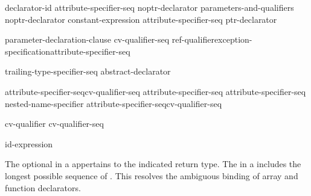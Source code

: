 \begin{bnf}
\br
    declarator-id attribute-specifier-seq\opt\br
    noptr-declarator parameters-and-qualifiers\br
    noptr-declarator \terminal{[} constant-expression\opt \terminal{]} attribute-specifier-seq\opt\br
    \terminal{(} ptr-declarator \terminal{)}
\end{bnf}

\begin{bnf}
\br
    \terminal{(} parameter-declaration-clause \terminal{)} cv-qualifier-seq\opt\br
\hspace*{\bnfindentinc}ref-qualifier\opt exception-specification\opt attribute-specifier-seq\opt
\end{bnf}

\begin{bnf}
\br
    \terminal{->} trailing-type-specifier-seq abstract-declarator\opt
\end{bnf}

\begin{bnf}
\br
    \terminal{*} attribute-specifier-seq\opt cv-qualifier-seq\opt\br
    \terminal{\&} attribute-specifier-seq\opt\br
    \terminal{\&\&} attribute-specifier-seq\opt\br
    nested-name-specifier \terminal{*} attribute-specifier-seq\opt cv-qualifier-seq\opt
\end{bnf}

\begin{bnf}
\br
    cv-qualifier cv-qualifier-seq\opt
\end{bnf}

\begin{bnf}
\br
    \br
\end{bnf}

\begin{bnf}
\br
    \terminal{\&}\br
    \terminal{\&\&}
\end{bnf}

\begin{bnf}
\br
    \opt id-expression
\end{bnf}

\pnum
The optional  in a
 appertains to the indicated return type. The
 in a  includes the longest
possible sequence of . \enternote This resolves the
ambiguous binding of array and function declarators. \enterexample

